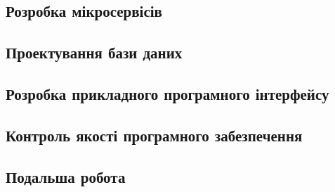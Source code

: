 \documentclass[a4paper,14pt]{extarticle} %
\begin{document}
\subsection{Розробка мікросервісів} 





\subsection{Проектування бази даних}






\subsection{Розробка прикладного програмного інтерфейсу} 






\subsection{Контроль якості програмного забезпечення}



\subsection{Подальша робота}



\end{document}
